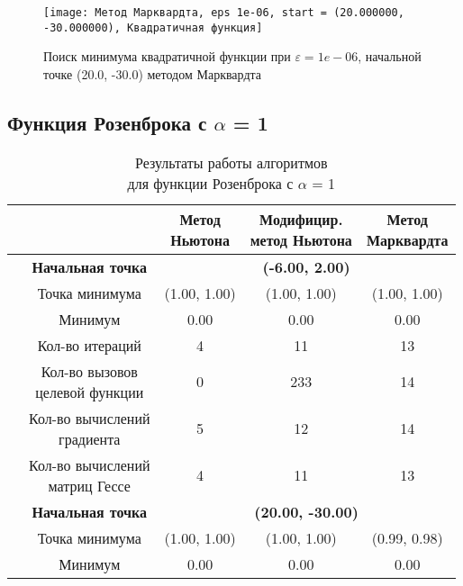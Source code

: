             \begin{figure}[H]
	        \centering
	        \texttt{[image: Метод Марквардта, eps 1e-06, start = (20.000000, -30.000000), Квадратичная функция]}%
	        \caption{Поиск минимума квадратичной функции при $\varepsilon = 1e-06$, начальной точке (20.0, -30.0) методом Марквардта}
	        \vspace*{-1.2cm}
            \end{figure}
            \subsection{Функция Розенброка с $\alpha$ = 1}

\begin{table}[H]
        \centering
        \vspace*{-1.5em}
        \caption{Результаты работы алгоритмов\\для функции Розенброка с $\alpha$ = 1}
        \footnotesize
        \begin{tabular}{|c|c|c|c|c|}
        \hline
        & &\makecell{Метод\\Ньютона} &\makecell{Модифицир.\\метод Ньютона} &\makecell{Метод\\Марквардта} \\
        \hline
	\multirow{12}{*}{\rotatebox[origin=c]{90}{$\varepsilon = 0.01$}}&\textbf{Начальная точка} &\multicolumn{3}{c|}{\textbf{(-6.00, 2.00)}}\\
	\cline{2-5}
	&Точка минимума &(1.00, 1.00) &(1.00, 1.00) &(1.00, 1.00) \\ 
	\cline{2-5}
	&Минимум &0.00 &0.00 &0.00 \\ 
	\cline{2-5}
	&Кол-во итераций &4 &11 &13 \\ 
	\cline{2-5}
	&\makecell{Кол-во вызовов\\целевой функции} &0 &233 &14 \\ 
	\cline{2-5}
	&\makecell{Кол-во вычислений\\градиента} &5 &12 &14 \\ 
	\cline{2-5}
	&\makecell{Кол-во вычислений\\матриц Гессе} &4 &11 &13 \\ 
	\cline{2-5}
\cline{2-5}&\textbf{Начальная точка} &\multicolumn{3}{c|}{\textbf{(20.00, -30.00)}}\\
	\cline{2-5}
	&Точка минимума &(1.00, 1.00) &(1.00, 1.00) &(0.99, 0.98) \\ 
	\cline{2-5}
	&Минимум &0.00 &0.00 &0.00 \\ 

\end{tabular}
\end{table}
